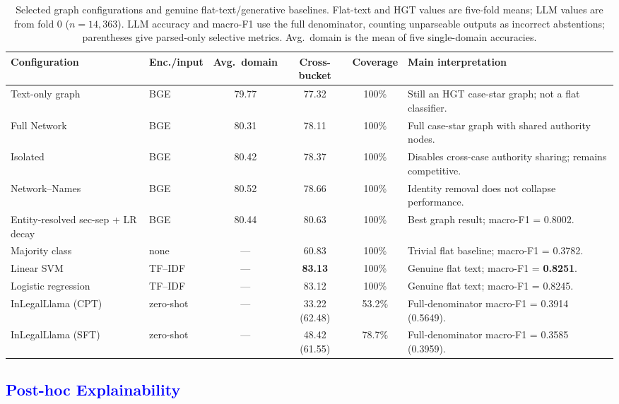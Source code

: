 \documentclass[runningheads]{llncs}
\begin{document}
\begin{table}[!htbp]
\centering
\caption{Selected graph configurations and genuine flat-text/generative baselines. Flat-text and HGT values are five-fold means; LLM values are from fold 0 ($n=14{,}363$). LLM accuracy and macro-F1 use the full denominator, counting unparseable outputs as incorrect abstentions; parentheses give parsed-only selective metrics. Avg.\ domain is the mean of five single-domain accuracies.}
\label{tab:accuracy-comparison}
\setlength{\tabcolsep}{4.5pt}
\renewcommand{\arraystretch}{1.05}
\scriptsize
\begin{adjustbox}{max width=\textwidth}
\begin{tabular}{p{3.25cm} l c c c p{4.5cm}}
\toprule
Configuration & Enc./input & Avg.\ domain & Cross-bucket & Coverage & Main interpretation \\
\midrule
Text-only graph & BGE & 79.77 & 77.32 & 100\% & Still an HGT case-star graph; not a flat classifier. \\
Full Network & BGE & 80.31 & 78.11 & 100\% & Full case-star graph with shared authority nodes. \\
Isolated & BGE & 80.42 & 78.37 & 100\% & Disables cross-case authority sharing; remains competitive. \\
Network--Names & BGE & 80.52 & 78.66 & 100\% & Identity removal does not collapse performance. \\
Entity-resolved sec-sep + LR decay & BGE & 80.44 & 80.63 & 100\% & Best graph result; macro-F1 = 0.8002. \\
\midrule
Majority class & none & --- & 60.83 & 100\% & Trivial flat baseline; macro-F1 = 0.3782. \\
Linear SVM & TF--IDF & --- & \textbf{83.13} & 100\% & Genuine flat text; macro-F1 = \textbf{0.8251}. \\
Logistic regression & TF--IDF & --- & 83.12 & 100\% & Genuine flat text; macro-F1 = 0.8245. \\
\midrule
InLegalLlama (CPT) & zero-shot & --- & 33.22 (62.48) & 53.2\% & Full-denominator macro-F1 = 0.3914 (0.5649). \\
InLegalLlama (SFT) & zero-shot & --- & 48.42 (61.55) & 78.7\% & Full-denominator macro-F1 = 0.3585 (0.3959). \\
\bottomrule
\end{tabular}
\end{adjustbox}
\end{table}

\subsection{\textcolor{blue}{Post-hoc Explainability}}
\label{sec:explainability}
\end{document}
